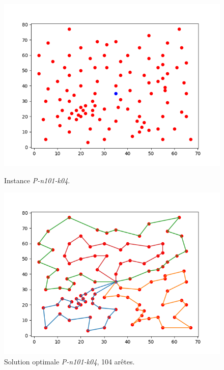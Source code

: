 \documentclass[a4paper,11pt]{article}%
\begin{document}
\begin{figure}[h!]
        \begin{minipage}[c]{.46\linewidth}
        \centering
        \includegraphics[scale=0.4]{Instance10104}
        
        \caption{Instance \emph{P-n101-k04}.}
        \label{P10104}
    \end{minipage}
    \hfill%
    \begin{minipage}[c]{.46\linewidth}
        \centering
        \includegraphics[scale=0.4]{Solution10104}
        
        \caption{Solution optimale \emph{P-n101-k04}, 104 arêtes.}
        \label{solP10104}
    \end{minipage}
\end{figure}
\end{document}
